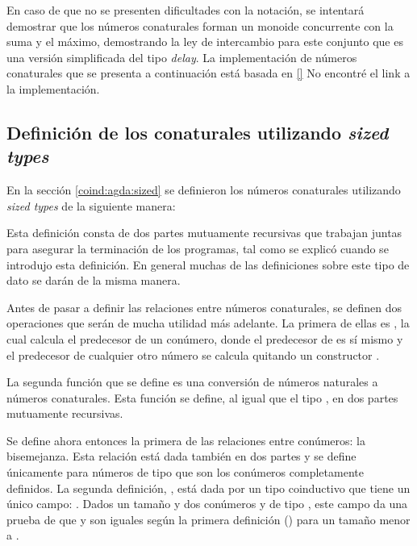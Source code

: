 En caso de que no se presenten dificultades con la notación, se intentará demostrar que los números conaturales forman un monoide concurrente con la suma y el máximo, demostrando la ley de intercambio para este conjunto que es una versión simplificada del tipo \textit{delay}. La implementación de números conaturales que se presenta a continuación está basada en \ref{} {\color{red} No encontré el link a la implementación}.

\subsection{Definición de los conaturales utilizando \textit{sized types}}\label{casodelay:sized:def}

En la sección \ref{coind:agda:sized} se definieron los números conaturales utilizando \textit{sized types} de la siguiente manera:

Esta definición consta de dos partes mutuamente recursivas que trabajan juntas para asegurar la terminación de los programas, tal como se explicó cuando se introdujo esta definición. En general muchas de las definiciones sobre este tipo de dato se darán de la misma manera. 

Antes de pasar a definir las relaciones entre números conaturales, se definen dos operaciones que serán de mucha utilidad más adelante. La primera de ellas es , la cual calcula el predecesor de un conúmero, donde el predecesor de  es sí mismo y el predecesor de cualquier otro número se calcula quitando un constructor .

La segunda función que se define es una conversión de números naturales a números conaturales. Esta función se define, al igual que el tipo , en dos partes mutuamente recursivas.

Se define ahora entonces la primera de las relaciones entre conúmeros: la bisemejanza. Esta relación está dada también en dos partes y se define únicamente para números de tipo  que son los conúmeros completamente definidos. La segunda definición, , está dada por un tipo  coinductivo que tiene un único campo: . Dados un tamaño  y dos conúmeros  y  de tipo , este campo da una prueba de que  y  son iguales según la primera definición (\AgdaFunction{$[\_]\_\sim\_$}) para un tamaño  menor a . 

